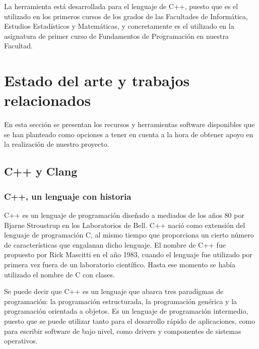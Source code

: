 La herramienta est\'a desarrollada para el lenguaje de C++, puesto que es el utilizado en los primeros cursos de los grados de las Facultades de Inform\'atica, Estudios Estad\'isticos y Matem\'aticas, y concretamente es el utilizado en la asignatura de primer curso de Fundamentos de Programaci\'on en nuestra Facultad.

\section{Estado del arte y trabajos relacionados}

En esta secci\'on se presentan los recursos y herramientas software disponibles que se han planteado como opciones a tener en cuenta a la hora de obtener apoyo en la realizaci\'on de nuestro proyecto.

\subsection{C++ y Clang}

\subsubsection*{C++, un lenguaje con historia}
\label{ap2:sec:c++}

C++ es un lenguaje de programaci\'on dise\~nado a mediados de los a\~nos 80 por Bjarne Stroustrup en los Laboratorios de Bell. C++ naci\'o como extensi\'on del lenguaje de programaci\'on C, al mismo tiempo que proporciona un cierto n\'umero de caracter\'isticas que engalanan dicho lenguaje. El nombre de C++ fue propuesto por Rick Mascitti en el a\~no 1983, cuando el lenguaje fue utilizado por primera vez fuera de un laboratorio cient\'ifico. Hasta ese momento se hab\'ia utilizado el nombre de C con clases. 

Se puede decir que C++ es un lenguaje que abarca tres paradigmas de programaci\'on: la programaci\'on estructurada, la programaci\'on gen\'erica y la programaci\'on orientada a objetos. Es un lenguaje de programaci\'on intermedio, puesto que se puede utilizar tanto para el desarrollo r\'apido de aplicaciones, como para escribir software de bajo nivel, como drivers y componentes de sistemas operativos.

